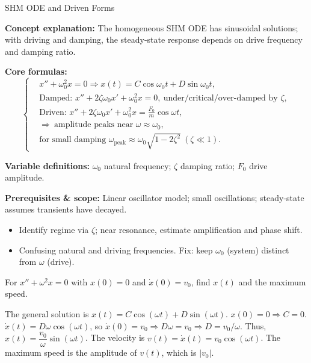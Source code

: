 \begin{KnowledgePoint}{SHM ODE and Driven Forms \Extension}
  \KPFormulas
  \begin{formulabox}
  \textbf{Concept explanation:} The homogeneous SHM ODE has sinusoidal solutions; with driving and damping, the steady-state response depends on drive frequency and damping ratio.

  \textbf{Core formulas:}
  \[
  \left\{\begin{aligned}
    &x''+\omega_0^2 x=0 \Rightarrow x(t)=C\cos\omega_0 t+D\sin\omega_0 t,\\
    &\text{Damped: } x''+2\zeta\omega_0 x'+\omega_0^2 x=0,\ \text{under/critical/over-damped by }\zeta,\\
      &\text{Driven: } x''+2\zeta\omega_0 x'+\omega_0^2 x=\frac{F_0}{m}\cos\omega t,\\
      &\Rightarrow\ \text{amplitude peaks near }\omega\approx\omega_0,\\
      &\text{for small damping }\omega_{\text{peak}}\approx\omega_0\sqrt{1-2\zeta^2}\ (\zeta\ll1).
  \end{aligned}\right.
  \]

  \textbf{Variable definitions:} $\omega_0$ natural frequency; $\zeta$ damping ratio; $F_0$ drive amplitude.

  \textbf{Prerequisites \& scope:} Linear oscillator model; small oscillations; steady-state assumes transients have decayed.
  \end{formulabox}

  \KPHeuristics
  \begin{heuristicsbox}
  \begin{itemize}[leftmargin=*]
    \item Identify regime via $\zeta$; near resonance, estimate amplification and phase shift.
  \end{itemize}
  \vspace{0.4em}
  \begin{itemize}[leftmargin=*]
    \item Confusing natural and driving frequencies. Fix: keep $\omega_0$ (system) distinct from $\omega$ (drive).
  \end{itemize}
  \end{heuristicsbox}

  \KPProblems
\begin{cheatproblem}
  For $x''+\omega^2x=0$ with $x(0)=0$ and $\dot x(0)=v_0$, find $x(t)$ and the maximum speed.
  \begin{solutionbox}
  The general solution is $x(t)=C\cos(\omega t)+D\sin(\omega t)$.
  $x(0)=0 \Rightarrow C=0$.
  $\dot x(t) = D\omega\cos(\omega t)$, so $\dot x(0)=v_0 \Rightarrow D\omega=v_0 \Rightarrow D=v_0/\omega$.
  Thus, $x(t)=\dfrac{v_0}{\omega}\sin(\omega t)$. The velocity is $v(t) = \dot x(t) = v_0\cos(\omega t)$.
  The maximum speed is the amplitude of $v(t)$, which is $|v_0|$.
  \end{solutionbox}
  \end{cheatproblem}
\end{KnowledgePoint}

